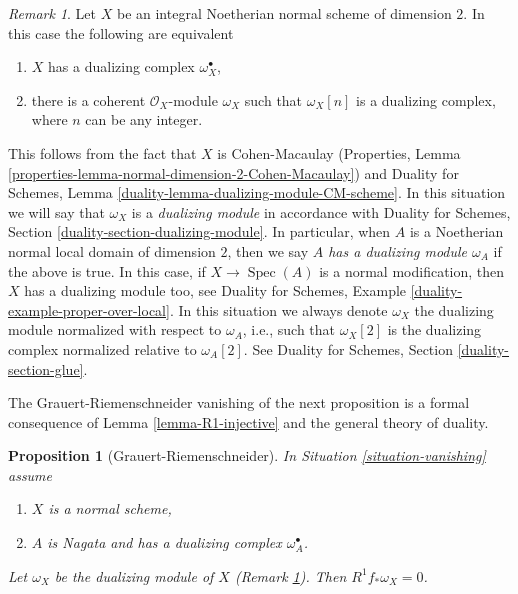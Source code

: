 \documentclass{stacks-project}
\theoremstyle{plain}
\newtheorem{proposition}[subsection]{Proposition}
\theoremstyle{definition}
\theoremstyle{remark}
\newtheorem{remark}[subsection]{Remark}
\numberwithin{equation}{subsection}
\def\Spec{\mathop{\mathrm{Spec}}}
\begin{document}
\begin{remark}
\label{remark-dualizing-setup}
Let $X$ be an integral Noetherian normal scheme of dimension $2$.
In this case the following are equivalent
\begin{enumerate}
\item $X$ has a dualizing complex $\omega_X^\bullet$,
\item there is a coherent $\mathcal{O}_X$-module $\omega_X$ such that
$\omega_X[n]$ is a dualizing complex, where $n$ can be any integer.
\end{enumerate}
This follows from the fact that $X$ is Cohen-Macaulay
(Properties, Lemma \ref{properties-lemma-normal-dimension-2-Cohen-Macaulay}) and
Duality for Schemes, Lemma \ref{duality-lemma-dualizing-module-CM-scheme}.
In this situation we will say that $\omega_X$ is a {\it dualizing module}
in accordance with
Duality for Schemes, Section \ref{duality-section-dualizing-module}.
In particular, when $A$ is a Noetherian normal local domain of dimension
$2$, then we say {\it $A$ has a dualizing module $\omega_A$}
if the above is true. In this case, if $X \to \Spec(A)$ is a normal
modification, then $X$ has a dualizing module too, see
Duality for Schemes, Example \ref{duality-example-proper-over-local}.
In this situation we always denote $\omega_X$ the dualizing
module normalized with respect to $\omega_A$, i.e., such that
$\omega_X[2]$ is the dualizing complex normalized relative to
$\omega_A[2]$. See Duality for Schemes, Section \ref{duality-section-glue}.
\end{remark}

\noindent
The Grauert-Riemenschneider vanishing of the next proposition is a formal
consequence of Lemma \ref{lemma-R1-injective} and the general theory of
duality.

\begin{proposition}[Grauert-Riemenschneider]
\label{proposition-Grauert-Riemenschneider}
In Situation \ref{situation-vanishing} assume
\begin{enumerate}
\item $X$ is a normal scheme,
\item $A$ is Nagata and has a dualizing complex $\omega_A^\bullet$.
\end{enumerate}
Let $\omega_X$ be the dualizing module of $X$
(Remark \ref{remark-dualizing-setup}). Then $R^1f_*\omega_X = 0$.
\end{proposition}
\end{document}
